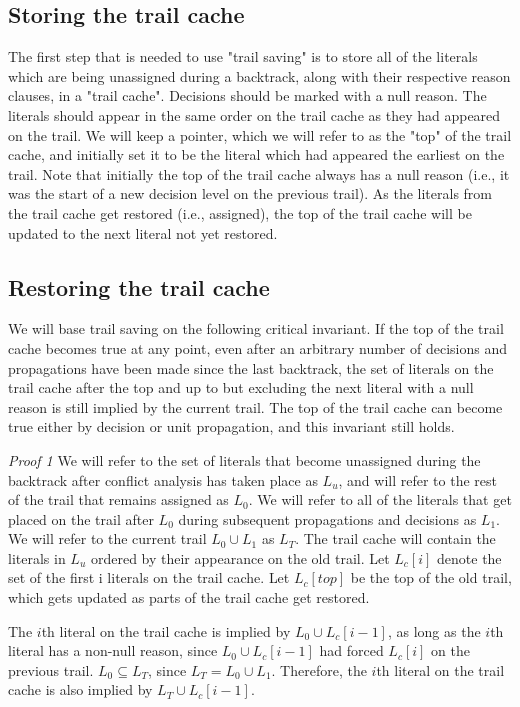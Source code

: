 \documentclass{article}
\begin{document}
\subsection{Storing the trail cache}

The first step that is needed to use "trail saving" is to store all of the literals which are being unassigned during a backtrack, along with their respective reason clauses, in a "trail cache". Decisions should be marked with a null reason. The literals should appear in the same order on the trail cache as they had appeared on the trail. We will keep a pointer, which we will refer to as the "top" of the trail cache, and initially set it to be the literal which had appeared the earliest on the trail. Note that initially the top of the trail cache always has a null reason (i.e., it was the start of a new decision level on the previous trail). As the literals from the trail cache get restored (i.e., assigned), the top of the trail cache will be updated to the next literal not yet restored.

\subsection{Restoring the trail cache}
We will base trail saving on the following critical invariant. If the top of the trail cache becomes true at any point, even after an arbitrary number of decisions and propagations have been made since the last backtrack, the set of literals on the trail cache after the top and up to but excluding the next literal with a null reason is still implied by the current trail. The top of the trail cache can become true either by decision or unit propagation, and this invariant still holds.\newline

\textit{Proof 1} We will refer to the set of literals that become unassigned during the backtrack after conflict analysis has taken place as $L_u$, and will refer to the rest of the trail that remains assigned as $L_0$. We will refer to all of the literals that get placed on the trail after $L_0$ during subsequent propagations and decisions as $L_1$. We will refer to the current trail $L_0 \cup L_1$ as $L_T$. The trail cache will contain the literals in $L_u$ ordered by their appearance on the old trail. Let $L_c[i]$ denote the set of the first i literals on the trail cache. Let $L_c[top]$ be the top of the old trail, which gets updated as parts of the trail cache get restored.

The $i$th literal on the trail cache is implied by $L_0 \cup L_c[i-1]$, as long as the $i$th literal has a non-null reason, since $L_0 \cup L_c[i-1]$ had forced $L_c[i]$ on the previous trail. $L_0 \subseteq L_T$, since $L_T = L_0 \cup L_1$. Therefore, the $i$th literal on the trail cache is also implied by $L_T \cup L_c[i-1]$.
\end{document}
